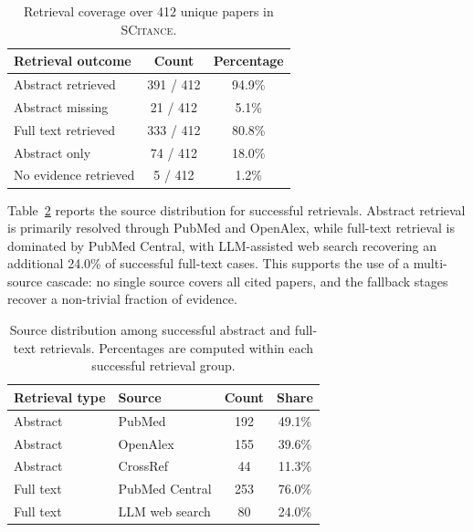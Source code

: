 \documentclass{article}
\theoremstyle{plain}
\theoremstyle{definition}
\theoremstyle{remark}
\begin{document}
\begin{table}[H]
\centering
\small
\caption{Retrieval coverage over 412 unique papers in \textsc{SCitance}.}
\label{tab:retrieval_coverage_app}

\begin{tabularx}{\columnwidth}{>{\raggedright\arraybackslash}Xcc}
\toprule
\textbf{Retrieval outcome} & \textbf{Count} & \textbf{Percentage} \\
\midrule
Abstract retrieved & 391 / 412 & 94.9\% \\
Abstract missing & 21 / 412 & 5.1\% \\
\midrule
Full text retrieved & 333 / 412 & 80.8\% \\
Abstract only & 74 / 412 & 18.0\% \\
No evidence retrieved & 5 / 412 & 1.2\% \\
\bottomrule
\end{tabularx}

\end{table}

Table~\ref{tab:retrieval_sources_app} reports the source distribution for successful retrievals. Abstract retrieval is primarily resolved through PubMed and OpenAlex, while full-text retrieval is dominated by PubMed Central, with LLM-assisted web search recovering an additional 24.0\% of successful full-text cases. This supports the use of a multi-source cascade: no single source covers all cited papers, and the fallback stages recover a non-trivial fraction of evidence.

\begin{table}[H]
\centering
\small
\caption{Source distribution among successful abstract and full-text retrievals. Percentages are computed within each successful retrieval group.}
\label{tab:retrieval_sources_app}

\begin{tabularx}{\columnwidth}{>{\raggedright\arraybackslash}X
                                  >{\raggedright\arraybackslash}X
                                  cc}
\toprule
\textbf{Retrieval type} & \textbf{Source} & \textbf{Count} & \textbf{Share} \\
\midrule
Abstract & PubMed & 192 & 49.1\% \\
Abstract & OpenAlex & 155 & 39.6\% \\
Abstract & CrossRef & 44 & 11.3\% \\
\midrule
Full text & PubMed Central & 253 & 76.0\% \\
Full text & LLM web search & 80 & 24.0\% \\
\bottomrule
\end{tabularx}

\end{table}
\end{document}
